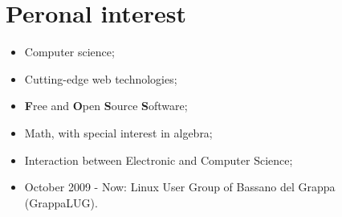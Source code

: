 \documentclass[pdftex, a4paper, 11pt]{article}
\begin{document}


\section*{Peronal interest}
\begin{itemize}
\item Computer science;
\item Cutting-edge web technologies;
\item {\bf F}ree and {\bf O}pen {\bf S}ource {\bf S}oftware;
\item Math, with special interest in algebra;
\item Interaction between Electronic and Computer Science;
\item October 2009 - Now: Linux User Group of Bassano del Grappa (GrappaLUG).
\end{itemize}
\end{document}
